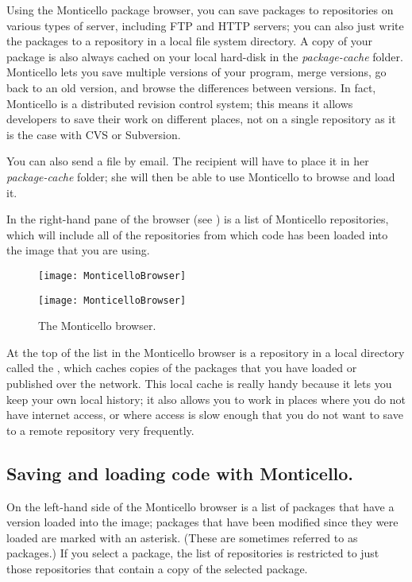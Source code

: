 \documentclass[a4paper,10pt,twoside]{book}
\begin{document}
Using the Monticello package browser, you can save packages to repositories on various types of server, including FTP and HTTP servers; you can also just write the packages to a repository in a local file system directory.
A copy of your package is also always cached on your local hard-disk in the \emph{package-cache} folder. 
Monticello lets you save multiple versions of your program, merge versions, go back to an old version, and browse the differences between versions. 
In fact, Monticello is a distributed revision control system; this means it allows developers to save their work on different places, not on a single repository as it is the case with CVS or Subversion.

You can also send a  file by email. 
The recipient will have to place it in her \emph{package-cache} folder; she will then be able to use Monticello to browse and load it. 

In the right-hand pane of the browser (see ) is a list of Monticello repositories, which will include all of the repositories from which code has been loaded into the image that you are using.  

\begin{figure}[hbt]
\ifluluelse
	{\centerline {\texttt{[image: MonticelloBrowser]}}}
	{\centerline {\texttt{[image: MonticelloBrowser]}}}
\caption{The Monticello browser.
}
\end{figure}

At the top of the list in the Monticello browser is a repository in a local directory called the , which caches copies of the packages that you have loaded or published over the network. This local cache is really handy because it lets you keep your own local history; it also allows you to work in places where you do not have internet access, or where access is slow enough that you do not want to save to a remote repository very frequently.


\subsection{Saving and loading code with Monticello.}
On the left-hand side of the Monticello browser is a list of packages that have a version loaded into the image; packages that have been modified since they were loaded are marked with an asterisk.  (These are sometimes referred to as  packages.)  If you select a package, the list of repositories is restricted to just those repositories that contain a copy of the selected package.
\end{document}
